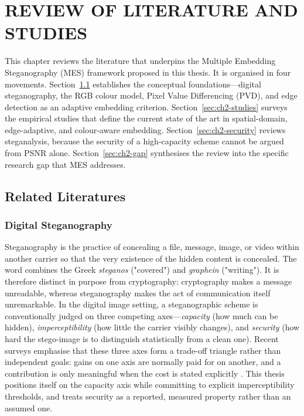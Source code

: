\chapter{REVIEW OF LITERATURE AND STUDIES} \label{cap:chapter2}

This chapter reviews the literature that underpins the Multiple Embedding Steganography (MES) framework proposed in this thesis. It is organised in four movements. Section~\ref{sec:ch2-foundations} establishes the conceptual foundations---digital steganography, the RGB colour model, Pixel Value Differencing (PVD), and edge detection as an adaptive embedding criterion. Section~\ref{sec:ch2-studies} surveys the empirical studies that define the current state of the art in spatial-domain, edge-adaptive, and colour-aware embedding. Section~\ref{sec:ch2-security} reviews steganalysis, because the security of a high-capacity scheme cannot be argued from PSNR alone. Section~\ref{sec:ch2-gap} synthesises the review into the specific research gap that MES addresses.

\section{Related Literatures} \label{sec:ch2-foundations}

\subsection{Digital Steganography}
Steganography is the practice of concealing a file, message, image, or video within another carrier so that the very existence of the hidden content is concealed. The word combines the Greek \textit{steganos} ("covered") and \textit{graphein} ("writing"). It is therefore distinct in purpose from cryptography: cryptography makes a message unreadable, whereas steganography makes the act of communication itself unremarkable. In the digital image setting, a steganographic scheme is conventionally judged on three competing axes---\textit{capacity} (how much can be hidden), \textit{imperceptibility} (how little the carrier visibly changes), and \textit{security} (how hard the stego-image is to distinguish statistically from a clean one). Recent surveys emphasise that these three axes form a trade-off triangle rather than independent goals: gains on one axis are normally paid for on another, and a contribution is only meaningful when the cost is stated explicitly \citep{kombrink2025survey, janok2026survey}. This thesis positions itself on the capacity axis while committing to explicit imperceptibility thresholds, and treats security as a reported, measured property rather than an assumed one.

